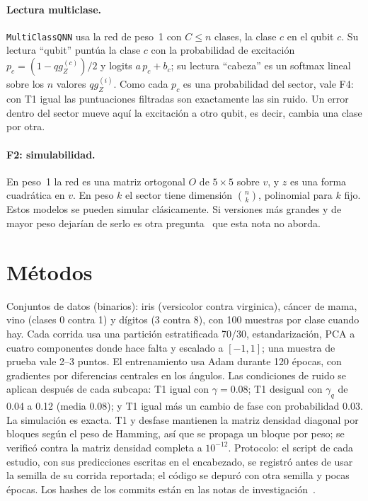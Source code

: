 \documentclass[11pt]{article}
\newcommand{\qZ}{qg_Z}
\begin{document}
\paragraph{Lectura multiclase.} \texttt{MultiClassQNN} usa la red de peso~1 con $C\le n$ clases, la clase $c$ en el
qubit $c$. Su lectura ``qubit'' puntúa la clase $c$ con la probabilidad de excitación $p_c=(1-\qZ^{(c)})/2$ y logits
$a\,p_c+b_c$; su lectura ``cabeza'' es un softmax lineal sobre los $n$ valores $\qZ^{(i)}$. Como cada $p_c$ es una
probabilidad del sector, vale F4: con T1 igual las puntuaciones filtradas son exactamente las sin ruido. Un error dentro
del sector mueve aquí la excitación a otro qubit, es decir, cambia una clase por otra.

\paragraph{F2: simulabilidad.} En peso~1 la red es una matriz ortogonal $O$ de $5\times5$ sobre $v$, y $z$ es una
forma cuadrática en $v$. En peso $k$ el sector tiene dimensión $\binom{n}{k}$, polinomial para $k$ fijo. Estos
modelos se pueden simular clásicamente. Si versiones más grandes y de mayor peso dejarían de serlo es otra
pregunta~\cite{cerezo2023simulability} que esta nota no aborda.

\section{Métodos}

Conjuntos de datos (binarios): iris (versicolor contra virginica), cáncer de mama, vino (clases 0 contra 1) y
dígitos (3 contra 8), con 100 muestras por clase cuando hay. Cada corrida usa una partición estratificada
70/30, estandarización, PCA a cuatro componentes donde hace falta y escalado a $[-1,1]$; una muestra de prueba
vale 2--3 puntos. El entrenamiento usa Adam durante 120 épocas, con gradientes por diferencias centrales en los
ángulos. Las condiciones de ruido se aplican después de cada subcapa: T1 igual con $\gamma=0.08$; T1 desigual
con $\gamma_q$ de 0.04 a 0.12 (media 0.08); y T1 igual más un cambio de fase con probabilidad 0.03. La
simulación es exacta. T1 y desfase mantienen la matriz densidad diagonal por bloques según el peso de Hamming,
así que se propaga un bloque por peso; se verificó contra la matriz densidad completa a $10^{-12}$. Protocolo:
el script de cada estudio, con sus predicciones escritas en el encabezado, se registró antes de usar la semilla
de su corrida reportada; el código se depuró con otra semilla y pocas épocas. Los hashes de los commits están en
las notas de investigación~\cite{monteverde2026qang}.
\end{document}
